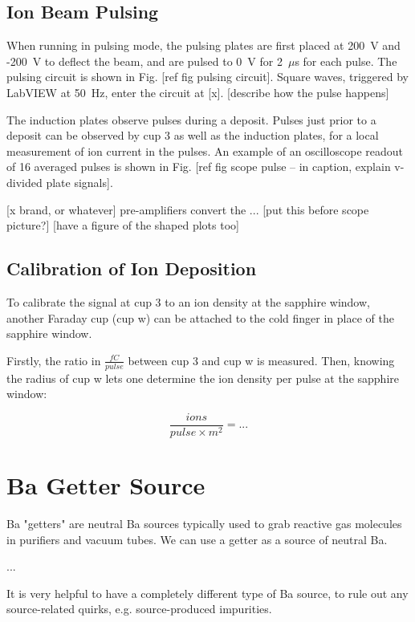 \subsection{Ion Beam Pulsing}

When running in pulsing mode, the pulsing plates are first placed at 200~V and -200~V to deflect the beam, and are pulsed to 0~V for {\color{red}2~$\mu$s} for each pulse.  The pulsing circuit is shown in Fig. [ref fig pulsing circuit].  Square waves, triggered by LabVIEW at {\color{red}50~Hz}, enter the circuit at [x]. {\color{red}[describe how the pulse happens]}

The induction plates observe pulses during a deposit.  Pulses just prior to a deposit can be observed by cup 3 as well as the induction plates, for a local measurement of ion current in the pulses.  An example of an oscilloscope readout of {\color{red}16} averaged pulses is shown in Fig. [ref fig scope pulse -- in caption, explain v-divided plate signals].  

[x brand, or whatever] pre-amplifiers convert the ... [put this before scope picture?] [have a figure of the shaped plots too]

\subsection{Calibration of Ion Deposition}

To calibrate the signal at cup 3 to an ion density at the sapphire window, another Faraday cup (cup w) can be attached to the cold finger in place of the sapphire window.  

Firstly, the ratio in $\frac{fC}{pulse}$ between cup 3 and cup w is measured.  Then, knowing the radius of cup w lets one determine the ion density per pulse at the sapphire window:

\begin{equation}
\frac{ions}{pulse \times m^{2}} = ...
\label{eqn:ion_density}
\end{equation}

\section{Ba Getter Source}

Ba "getters" are neutral Ba sources typically used to grab reactive gas molecules in purifiers and vacuum tubes.  We can use a getter as a source of neutral Ba.

...

It is very helpful to have a completely different type of Ba source, to rule out any source-related quirks, e.g. source-produced impurities.

